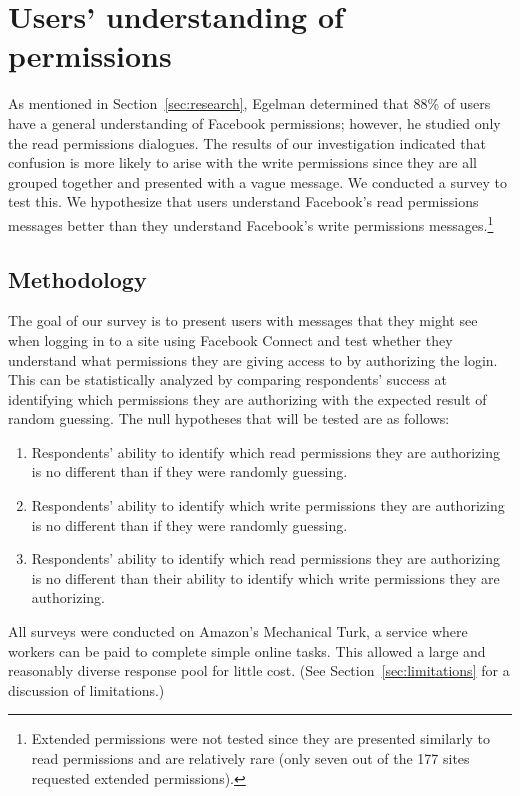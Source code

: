 \documentclass[10pt]{sig-alternate-10pt}
\begin{document}
\section{Users' understanding of permissions}
\label{sec:understanding}

As mentioned in Section~\ref{sec:research}, Egelman \cite{egelman} determined that 88\% of users have a general understanding of Facebook permissions; however, he studied only the read permissions dialogues. The results of our investigation indicated that confusion is more likely to arise with the write permissions since they are all grouped together and presented with a vague message. We conducted a survey to test this. We hypothesize that users understand Facebook's read permissions messages better than they understand Facebook's write permissions messages.\footnote{Extended permissions were not tested since they are presented similarly to read permissions and are relatively rare (only seven out of the 177 sites requested extended permissions).}

\subsection{Methodology}

The goal of our survey is to present users with messages that they might see when logging in to a site using Facebook Connect and test whether they understand what permissions they are giving access to by authorizing the login. This can be statistically analyzed by comparing respondents' success at identifying which permissions they are authorizing with the expected result of random guessing. The null hypotheses that will be tested are as follows:

\begin{enumerate}
  \item Respondents' ability to identify which read permissions they are authorizing is no different than if they were randomly guessing.
  \item Respondents' ability to identify which write permissions they are authorizing is no different than if they were randomly guessing.
  \item Respondents' ability to identify which read permissions they are authorizing is no different than their ability to identify which write permissions they are authorizing.
\end{enumerate}

All surveys were conducted on Amazon's Mechanical Turk, a service where workers can be paid to complete simple online tasks. This allowed a large and reasonably diverse response pool for little cost. (See Section~\ref{sec:limitations} for a discussion of limitations.)
\end{document}
